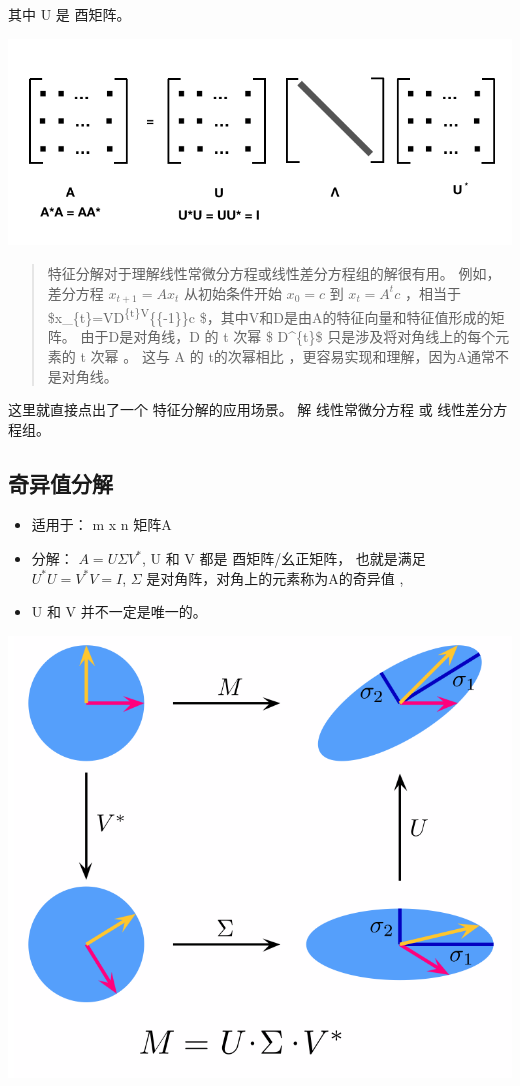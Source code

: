 \documentclass[
]{book}
\providecommand{\tightlist}{%
  \setlength{\itemsep}{0pt}\setlength{\parskip}{0pt}}
\begin{document}
其中 U 是 酉矩阵。

\includegraphics{images/eigen_02.png}

\begin{quote}
特征分解对于理解线性常微分方程或线性差分方程组的解很有用。 例如，差分方程 \(x_{t+1} = A x_t\) 从初始条件开始 \(x_0 = c\) 到 \(x_{t}=A^{t}c\) ，相当于 \$x\_\{t\}=VD\textsuperscript{\{t\}V}\{\{-1\}\}c \$，其中V和D是由A的特征向量和特征值形成的矩阵。 由于D是对角线，D 的 t 次幂 \$ D\^{}\{t\}\$ 只是涉及将对角线上的每个元素的 t 次幂 。 这与 A 的 t的次幂相比 ，更容易实现和理解，因为A通常不是对角线。
\end{quote}

这里就直接点出了一个 特征分解的应用场景。 解 线性常微分方程 或 线性差分方程组。

\hypertarget{ux5947ux5f02ux503cux5206ux89e3}{%
\subsection{奇异值分解}\label{ux5947ux5f02ux503cux5206ux89e3}}

\begin{itemize}
\tightlist
\item
  适用于： m x n 矩阵A
\item
  分解： \(A=U \Sigma V^*\), U 和 V 都是 酉矩阵/幺正矩阵， 也就是满足 \(U^*U= V^*V = I\), \(\Sigma\) 是对角阵，对角上的元素称为A的奇异值 ,
\item
  U 和 V 并不一定是唯一的。
\end{itemize}

\includegraphics{images/svd_headline.png}
\end{document}
